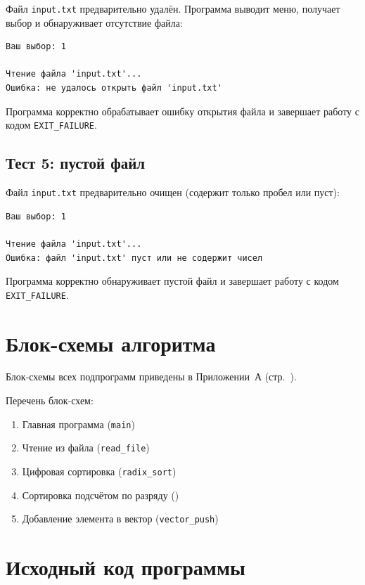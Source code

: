 \documentclass[a4paper,14pt]{extarticle}
\newcommand{\tcode}[1]{\code{#1}}
\begin{document}
Файл \texttt{input.txt} предварительно удалён. Программа выводит меню, получает выбор и обнаруживает отсутствие файла:

\begin{Verbatim}[frame=single,fontsize=\footnotesize]
Ваш выбор: 1

Чтение файла 'input.txt'...
Ошибка: не удалось открыть файл 'input.txt'
\end{Verbatim}

Программа корректно обрабатывает ошибку открытия файла и завершает работу с кодом \texttt{EXIT\_FAILURE}.

\subsection{Тест 5: пустой файл}

Файл \texttt{input.txt} предварительно очищен (содержит только пробел или пуст):

\begin{Verbatim}[frame=single,fontsize=\footnotesize]
Ваш выбор: 1

Чтение файла 'input.txt'...
Ошибка: файл 'input.txt' пуст или не содержит чисел
\end{Verbatim}

Программа корректно обнаруживает пустой файл и завершает работу с кодом \texttt{EXIT\_FAILURE}.

\newpage
\section{Блок-схемы алгоритма}

Блок-схемы всех подпрограмм приведены в Приложении~А (стр.~\pageref{sec:appendix}).

Перечень блок-схем:
\begin{enumerate}
  \item Главная программа (\texttt{main})
  \item Чтение из файла (\texttt{read\_file})
  \item Цифровая сортировка (\texttt{radix\_sort})
  \item Сортировка подсчётом по разряду (\tcode{counting_sort_by_digit})
  \item Добавление элемента в вектор (\texttt{vector\_push})
\end{enumerate}

\newpage
\section{Исходный код программы}
\end{document}
